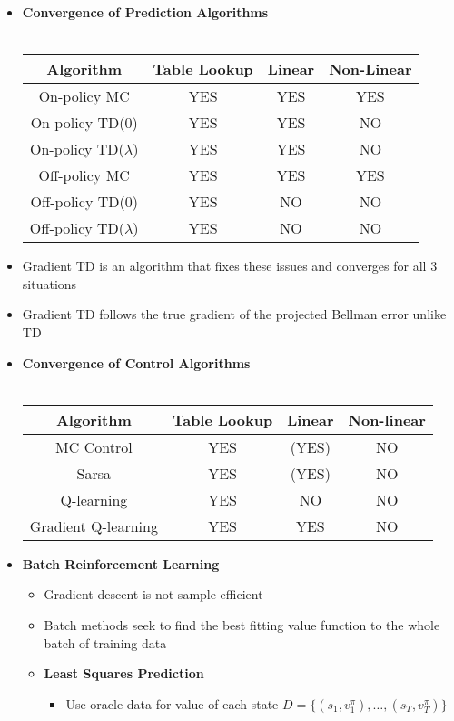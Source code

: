 \documentclass[12pt]{article}
\begin{document}
\begin{itemize}
\begin{itemize}
    \end{itemize}
    \item \textbf{Convergence of Prediction Algorithms} \\ \\
    \begin{tabular}{c | c | c | c}
    \textbf{Algorithm}&\textbf{Table Lookup}&\textbf{Linear}&\textbf{Non-Linear}\\
    \hline
    On-policy MC&YES&YES&YES \\
    \hline
    On-policy TD(0)&YES&YES&NO \\
    \hline
    On-policy TD($\lambda$)&YES&YES&NO \\
    \hline
    Off-policy MC&YES&YES&YES \\
    \hline
    Off-policy TD(0)&YES&NO&NO \\
    \hline
    Off-policy TD($\lambda$)&YES&NO&NO \\
    \hline
    \end{tabular}
    \item Gradient TD is an algorithm that fixes these issues and converges for all 3 situations
    \item Gradient TD follows the true gradient of the projected Bellman error unlike TD
    \item \textbf{Convergence of Control Algorithms} \\ \\
    \begin{tabular} {c | c | c | c}
      \textbf{Algorithm}&\textbf{Table Lookup}&\textbf{Linear}&\textbf{Non-linear} \\
      \hline
      MC Control&YES&(YES)&NO \\
      \hline
      Sarsa&YES&(YES)&NO \\
      \hline
      Q-learning&YES&NO&NO \\
      \hline
      Gradient Q-learning&YES&YES&NO 
    \end{tabular}
    \item \textbf{Batch Reinforcement Learning}
    \begin{itemize}
      \item Gradient descent is not sample efficient
      \item Batch methods seek to find the best fitting value function to the whole batch of training data
      \item \textbf{Least Squares Prediction}
      \begin{itemize}
        \item Use oracle data for value of each state $D = \{(s_1, v^\pi_1), \dots, (s_T, v^\pi_T)\}$

\end{itemize}
\end{itemize}
\end{itemize}
\end{document}
